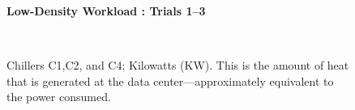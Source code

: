 \documentclass{report}
\begin{document}
\begin{figure}[!h]
\centerline{\bfseries\large Low-Density Workload : Trials 1--3}\\
\caption{Chillers C1,C2, and C4; Kilowatts (KW). This is the amount of heat that is generated at the data center---approximately equivalent to the power consumed.}
\end{figure}
\end{document}
